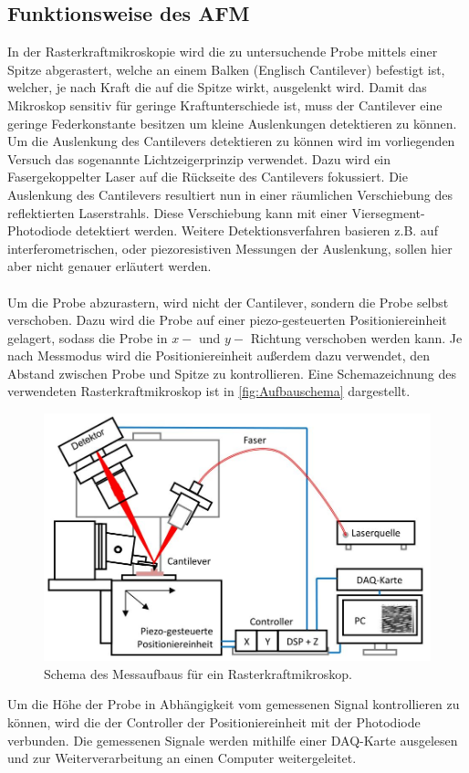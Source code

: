 \subsection{Funktionsweise des AFM}
\label{subsec:afmfunk}
In der Rasterkraftmikroskopie wird die zu untersuchende Probe mittels einer Spitze abgerastert, welche an einem Balken (Englisch Cantilever) befestigt ist, welcher, je nach Kraft die auf die Spitze wirkt, ausgelenkt wird.
Damit das Mikroskop sensitiv für geringe Kraftunterschiede ist, muss der Cantilever eine geringe Federkonstante besitzen um kleine Auslenkungen detektieren zu können. Um die Auslenkung des Cantilevers detektieren zu können wird im vorliegenden Versuch das sogenannte Lichtzeigerprinzip verwendet. Dazu wird ein Fasergekoppelter Laser auf die Rückseite des Cantilevers fokussiert. Die Auslenkung des Cantilevers resultiert nun in einer räumlichen Verschiebung des reflektierten Laserstrahls. Diese Verschiebung kann mit einer Viersegment-Photodiode detektiert werden. Weitere Detektionsverfahren basieren z.B. auf interferometrischen, oder piezoresistiven Messungen der Auslenkung, sollen hier aber nicht genauer erläutert werden.\\
\\
Um die Probe abzurastern, wird nicht der Cantilever, sondern die Probe selbst verschoben. Dazu wird die Probe auf einer piezo-gesteuerten Positioniereinheit gelagert, sodass die Probe in $x-$ und $y-$ Richtung verschoben werden kann. Je nach Messmodus wird die Positioniereinheit außerdem dazu verwendet, den Abstand zwischen Probe und Spitze zu kontrollieren. Eine Schemazeichnung des verwendeten Rasterkraftmikroskop ist in \autoref{fig:Aufbauschema} dargestellt.
\begin{figure}[H]
\centering
  \includegraphics[width=\textwidth]{content/plots/Aufbau.jpg}
  \caption{Schema des Messaufbaus für ein Rasterkraftmikroskop.}
  \label{fig:Aufbauschema}
\end{figure}
Um die Höhe der Probe in Abhängigkeit vom gemessenen Signal kontrollieren zu können, wird die der Controller der Positioniereinheit mit der Photodiode verbunden. Die gemessenen Signale werden mithilfe einer DAQ-Karte ausgelesen und zur Weiterverarbeitung an einen Computer weitergeleitet.

